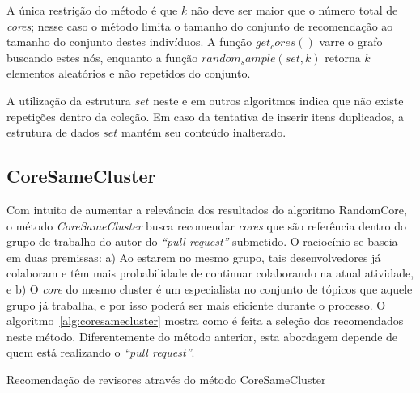 \documentclass[12pt,openany,oneside,a4paper,english,brazil]{abntbibufjf}
\begin{document}
A única restrição do método é que $k$ não deve ser maior que o número total de \textit{cores}; nesse caso o método limita o tamanho do conjunto de recomendação ao tamanho do conjunto destes indivíduos. A função $get_cores()$ varre o grafo buscando estes nós, enquanto a função $random_sample(set, k)$ retorna $k$ elementos aleatórios e não repetidos do conjunto.

 A utilização da estrutura $set$ neste e em outros algoritmos indica que não existe repetições dentro da coleção. Em caso da tentativa de inserir itens duplicados, a estrutura de dados $set$ mantém seu conteúdo inalterado.

  \subsection{CoreSameCluster}
  Com intuito de aumentar a relevância dos resultados do algoritmo RandomCore, o método \textit{CoreSameCluster} busca recomendar \textit{cores} que são referência dentro do grupo de trabalho do autor do \textit{``pull request''} submetido. O raciocínio se baseia em duas premissas: a) Ao estarem no mesmo grupo, tais desenvolvedores já colaboram e têm mais probabilidade de continuar colaborando na atual atividade, e b) O \textit{core} do mesmo cluster é um especialista no conjunto de tópicos que aquele grupo já trabalha, e por isso poderá ser mais eficiente durante o processo.  O algoritmo~\ref{alg:coresamecluster} mostra como é feita a seleção dos recomendados neste método. Diferentemente do método anterior, esta abordagem depende de quem está realizando o \textit{``pull request''}.


  \begin{algorithm}

   \caption{Recomendação de revisores através do método CoreSameCluster}  \label{alg:coresamecluster}

  \end{algorithm}
\end{document}
